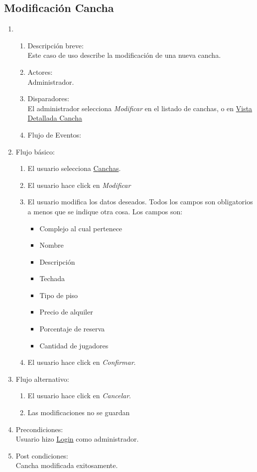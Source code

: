 \documentclass[a4paper,11pt]{article}
\begin{document}
\subsection{Modificaci\'on Cancha}
\begin{enumerate}

    \item
    	\begin{enumerate}
    	\item Descripci\'on breve: \\
	        Este caso de uso describe la modificaci\'on de una nueva cancha.
    	\item Actores: \\
        	Administrador.
    	\item Disparadores: \\
        	El administrador selecciona \emph{Modificar} en el listado de canchas, o en \underline{Vista Detallada Cancha}
    	\item Flujo de Eventos: 
	\end{enumerate} 
    \item Flujo b\'asico:
		\begin{enumerate}
        		\item El usuario selecciona \underline{Canchas}.
                        \item El usuario hace click en \emph{Modificar}
			\item El usuario modifica los datos deseados. Todos los campos son obligatorios a menos que se indique otra cosa. Los campos son: 
			\begin{itemize}
				 \item Complejo al cual pertenece
				 \item Nombre
				 \item Descripci\'on
				 \item Techada
				 \item Tipo de piso
				 \item Precio de alquiler
		                 \item Porcentaje de reserva
				 \item Cantidad de jugadores
			\end{itemize}
                        \item El usuario hace click en \emph{Confirmar}.
                \end{enumerate}
	\item Flujo alternativo:
		\begin{enumerate}
		 \item El usuario hace click en \emph{Cancelar}.
		 \item Las modificaciones no se guardan
		\end{enumerate}

    \item Precondiciones: \\
        Usuario hizo \underline{Login} como administrador.

    \item Post condiciones: \\
        Cancha modificada exitosamente.

\end{enumerate}
\end{document}
